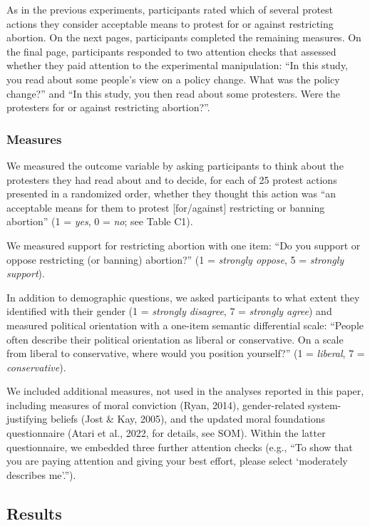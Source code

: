 \documentclass[12pt, letterpaper]{article}
\begin{document}
\noindent As in the previous experiments, participants rated which of
several protest actions they consider acceptable means to protest for or
against restricting abortion. On the next pages, participants completed
the remaining measures. On the final page, participants responded to two
attention checks that assessed whether they paid attention to the
experimental manipulation: ``In this study, you read about some people's
view on a policy change. What was the policy change?'' and ``In this
study, you then read about some protesters. Were the protesters for or
against restricting abortion?''.

\hypertarget{measures-2}{%
\subsubsection{Measures}\label{measures-2}}

We measured the outcome variable by asking participants to think about
the protesters they had read about and to decide, for each of 25 protest
actions presented in a randomized order, whether they thought this
action was ``an acceptable means for them to protest {[}for/against{]}
restricting or banning abortion'' (1 = \emph{yes}, 0 = \emph{no}; see
Table C1).

We measured support for restricting abortion with one item: ``Do you
support or oppose restricting (or banning) abortion?'' (1 =
\emph{strongly oppose}, 5 = \emph{strongly support}).

In addition to demographic questions, we asked participants to what
extent they identified with their gender (1 = \emph{strongly disagree},
7 = \emph{strongly agree}) and measured political orientation with a
one-item semantic differential scale: ``People often describe their
political orientation as liberal or conservative. On a scale from
liberal to conservative, where would you position yourself?'' (1 =
\emph{liberal}, 7 = \emph{conservative}).

We included additional measures, not used in the analyses reported in
this paper, including measures of moral conviction (Ryan, 2014),
gender-related system-justifying beliefs (Jost \& Kay, 2005), and the
updated moral foundations questionnaire (Atari et al., 2022, for
details, see SOM). Within the latter questionnaire, we embedded three
further attention checks (e.g., ``To show that you are paying attention
and giving your best effort, please select `moderately describes
me'.'').

\hypertarget{results-2}{%
\subsection{Results}\label{results-2}}
\end{document}
